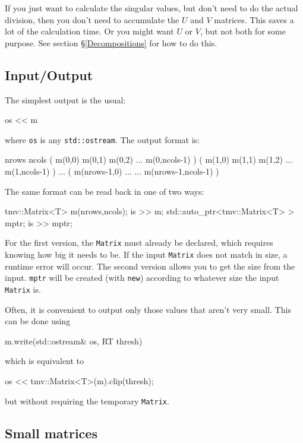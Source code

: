 \documentclass[twoside,letterpaper,11pt]{article}
\renewcommand{\tt}[1]{{\lstinline {#1}}}
\begin{document}
If you just want to calculate the singular values,
but don't need to do the actual division, then you don't need to 
accumulate the $U$ and $V$ matrices.  This saves a lot of the 
calculation time.  Or you might want $U$ or $V$, but not both for 
some purpose.  See section \S\ref{Decompositions} for how to do this.

\subsection{Input/Output}
\label{Matrix_IO}

The simplest output is the usual:
\begin{tmvcode}
os << m
\end{tmvcode}
where \tt{os} is any \tt{std::ostream}.
The output format is:
\begin{tmvcode}
nrows ncols
( m(0,0)  m(0,1)  m(0,2)  ...  m(0,ncols-1) )
( m(1,0)  m(1,1)  m(1,2)  ...  m(1,ncols-1) )
...
( m(nrows-1,0) ...  ...  m(nrows-1,ncols-1) )
\end{tmvcode}

The same format can be read back in one of two ways:
\begin{tmvcode}
tmv::Matrix<T> m(nrows,ncols);
is >> m;
std::auto_ptr<tmv::Matrix<T> > mptr;
is >> mptr;
\end{tmvcode}
For the first version, the \tt{Matrix} must already be declared, which 
requires knowing how big it needs to be.  If the input \tt{Matrix} does not
match in size, a runtime error will occur.
The second version allows you to get the size from the input.  \tt{mptr}
will be created (with \tt{new}) 
according to whatever size the input \tt{Matrix} is.

Often, it is convenient to output only those values that aren't very small. 
This can be done using
\begin{tmvcode}
m.write(std::ostream& os, RT thresh)
\end{tmvcode}
which is equivalent to
\begin{tmvcode}
os << tmv::Matrix<T>(m).clip(thresh);
\end{tmvcode}
but without requiring the temporary \tt{Matrix}.

\subsection{Small matrices}
\label{SmallMatrix}
\end{document}
